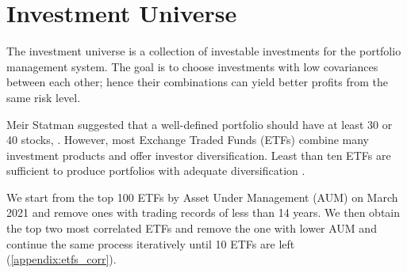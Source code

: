 \section{Investment Universe}
The investment universe is a collection of investable investments for the portfolio management system. The goal is to choose investments with low covariances between each other; hence their combinations can yield better profits from the same risk level\cite{willenbrock2011diversification}. 
\par 
Meir Statman suggested that a well-defined portfolio should have at least 30 or 40 stocks,  \cite{statman1987many}. However, most Exchange Traded Funds (ETFs) combine many investment products and offer investor diversification. Least than ten ETFs are sufficient to produce portfolios with adequate diversification \cite{chang_2016}.
\par
We start from the top 100 ETFs by Asset Under Management (AUM) on March 2021 and remove ones with trading records of less than 14 years. We then obtain the top two most correlated ETFs and remove the one with lower AUM and continue the same process iteratively until 10 ETFs are left (\autoref{appendix:etfs_corr}).
\par